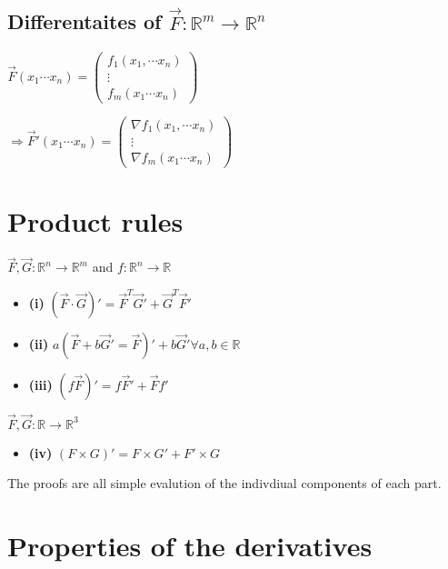 \documentclass{tufte-book}
\providecommand{\tightlist}{%
  \setlength{\itemsep}{0pt}\setlength{\parskip}{0pt}}
\begin{document}
\hypertarget{differentaites-of-vecf-mathbbrm-to-mathbbrn}{%
\subsection{\texorpdfstring{Differentaites of
\(\vec{F}: \mathbb{R}^m \to \mathbb{R}^n\)}{Differentaites of \textbackslash{}vec\{F\}: \textbackslash{}mathbb\{R\}\^{}m \textbackslash{}to \textbackslash{}mathbb\{R\}\^{}n}}\label{differentaites-of-vecf-mathbbrm-to-mathbbrn}}

\(\vec{F}( x_1 \cdots x_n)= \begin{pmatrix} f_1(x_1, \cdots x_n) \\ \vdots \\ f_m(x_1 \cdots x_n)\end{pmatrix}\)

\(\Rightarrow \vec{F}'( x_1 \cdots x_n) = \begin{pmatrix} \nabla f_1(x_1, \cdots x_n) \\ \vdots \\ \nabla f_m(x_1 \cdots x_n)\end{pmatrix}\)\hypertarget{product-rules}{%
\section{Product rules}\label{product-rules}}

\(\vec{F},\vec{G} : \mathbb{R}^n \to \mathbb{R}^m\) and
\(f:\mathbb{R}^n \to \mathbb{R}\)

\begin{itemize}
\tightlist
\item
  \textbf{(i)}
  \((\vec{F} \cdot \vec{G}) '= \vec{F}^T \vec{G}' + \vec{G}^T \vec{F}'\)
\item
  \textbf{(ii)}
  \(a (\vec{F} + b \vec{G}' = \vec{F})' + b\vec{G}' \forall a,b \in \mathbb{R}\)
\item
  \textbf{(iii)} \((f\vec{F})' = f\vec{F}' + \vec{F}f'\)
\end{itemize}

\(\vec{F}, \vec{G} : \mathbb{R} \to \mathbb{R}^3\)

\begin{itemize}
\tightlist
\item
  \textbf{(iv)} \((F \times G)' = F \times G' + F' \times G\)
\end{itemize}

The proofs are all simple evalution of the indivdiual components of each
part.\hypertarget{properties-of-the-derivatives}{%
\section{Properties of the
derivatives}\label{properties-of-the-derivatives}}
\end{document}
